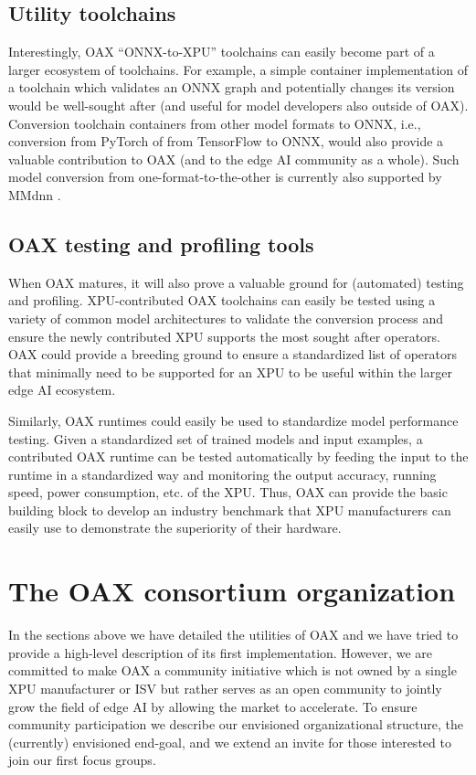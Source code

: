 \documentclass{article}
\begin{document}
\subsection{Utility toolchains}

Interestingly, OAX ``ONNX-to-XPU'' toolchains can easily become part of a larger ecosystem of toolchains. For example, a simple container implementation of a toolchain which validates an ONNX graph and potentially changes its version would be well-sought after (and useful for model developers also outside of OAX). Conversion toolchain containers from other model formats to ONNX, i.e., conversion from PyTorch of from TensorFlow to ONNX, would also provide a valuable contribution to OAX (and to the edge AI community as a whole). Such model conversion from one-format-to-the-other is currently also supported by MMdnn \cite{MMdnn}. 

\subsection{OAX testing and profiling tools}

When OAX matures, it will also prove a valuable ground for (automated) testing and profiling. XPU-contributed OAX toolchains can easily be tested using a variety of common model architectures to validate the conversion process and ensure the newly contributed XPU supports the most sought after operators. OAX could provide a breeding ground to ensure a standardized list of operators that minimally need to be supported for an XPU to be useful within the larger edge AI ecosystem.

Similarly, OAX runtimes could easily be used to standardize model performance testing. Given a standardized set of trained models and input examples, a contributed OAX runtime can be tested automatically by feeding the input to the runtime in a standardized way and monitoring the output accuracy, running speed, power consumption, etc. of the XPU. Thus, OAX can provide the basic building block to develop an industry benchmark that XPU manufacturers can easily use to demonstrate the superiority of their hardware.

\section{The OAX consortium organization}
\label{sec:oax-organization}

In the sections above we have detailed the utilities of OAX and we have tried to provide a high-level description of its first implementation. However, we are committed to make OAX a community initiative which is not owned by a single XPU manufacturer or ISV but rather serves as an open community to jointly grow the field of edge AI by allowing the market to accelerate. To ensure community participation we describe our envisioned organizational structure, the (currently) envisioned end-goal, and we extend an invite for those interested to join our first focus groups.
\end{document}
